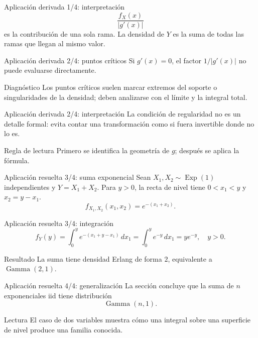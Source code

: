 \documentclass[10pt,aspectratio=169]{beamer}
\begin{document}
\begin{frame}{Aplicación derivada 1/4: interpretación}
  \footnotesize
  \[
    \frac{f_X(x)}{|g'(x)|}
  \]
  es la contribución de una sola rama. La densidad de $Y$ es la suma de todas
  las ramas que llegan al mismo valor.
\end{frame}

\begin{frame}{Aplicación derivada 2/4: puntos críticos}
  \footnotesize
  Si $g'(x)=0$, el factor $1/|g'(x)|$ no puede evaluarse directamente.
  \begin{alertblock}{Diagnóstico}
    Los puntos críticos suelen marcar extremos del soporte o singularidades de
    la densidad; deben analizarse con el límite y la integral total.
  \end{alertblock}
\end{frame}

\begin{frame}{Aplicación derivada 2/4: interpretación}
  \footnotesize
  La condición de regularidad no es un detalle formal: evita contar una
  transformación como si fuera invertible donde no lo es.
  \begin{exampleblock}{Regla de lectura}
    Primero se identifica la geometría de $g$; después se aplica la fórmula.
  \end{exampleblock}
\end{frame}

\begin{frame}{Aplicación resuelta 3/4: suma exponencial}
  \footnotesize
  Sean $X_1,X_2\sim\operatorname{Exp}(1)$ independientes y $Y=X_1+X_2$.
  Para $y>0$, la recta de nivel tiene $0<x_1<y$ y $x_2=y-x_1$.
  \[
    f_{X_1,X_2}(x_1,x_2)=e^{-(x_1+x_2)}.
  \]
\end{frame}

\begin{frame}{Aplicación resuelta 3/4: integración}
  \footnotesize
  \[
    f_Y(y)=\int_0^y e^{-(x_1+y-x_1)}\,dx_1
    =\int_0^y e^{-y}\,dx_1=ye^{-y},\quad y>0.
  \]
  \begin{alertblock}{Resultado}
    La suma tiene densidad Erlang de forma $2$, equivalente a
    $\operatorname{Gamma}(2,1)$.
  \end{alertblock}
\end{frame}

\begin{frame}{Aplicación resuelta 4/4: generalización}
  \footnotesize
  La sección concluye que la suma de $n$ exponenciales iid tiene distribución
  \[
    \operatorname{Gamma}(n,1).
  \]
  \begin{block}{Lectura}
    El caso de dos variables muestra cómo una integral sobre una superficie de
    nivel produce una familia conocida.
  \end{block}
\end{frame}
\end{document}
